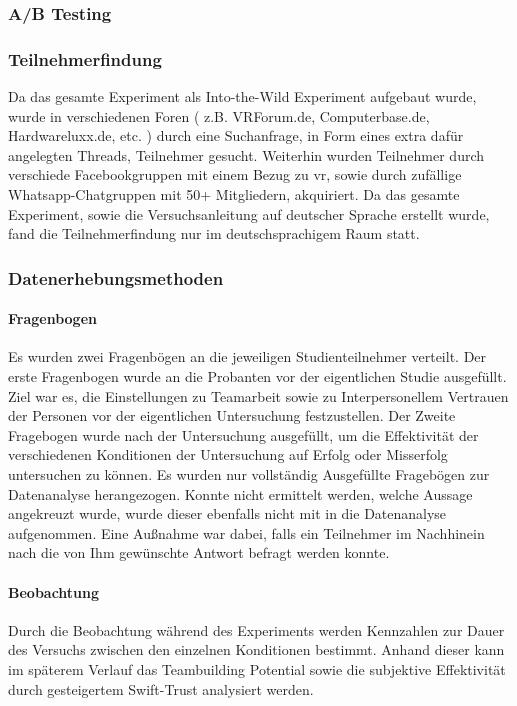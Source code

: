 \documentclass[a4paper,11pt]{article}%
\renewcommand{\\}{\vspace*{0.5\baselineskip} \newline}
\begin{document}
			\subsubsection{A/B Testing}
			\subsubsection{Teilnehmerfindung}
Da das gesamte Experiment als Into-the-Wild Experiment aufgebaut wurde, wurde in verschiedenen Foren ( z.B. VRForum.de, Computerbase.de, Hardwareluxx.de, etc. ) durch eine Suchanfrage, in Form eines extra dafür angelegten Threads, Teilnehmer gesucht. Weiterhin wurden Teilnehmer durch verschiede Facebookgruppen mit einem Bezug zu \ac{vr}, sowie durch zufällige Whatsapp-Chatgruppen mit 50+ Mitgliedern, akquiriert. Da das gesamte Experiment, sowie die Versuchsanleitung auf deutscher Sprache erstellt wurde, fand die Teilnehmerfindung nur im deutschsprachigem Raum statt.
			\subsubsection{Datenerhebungsmethoden}
				\paragraph{Fragenbogen}
Es wurden zwei Fragenbögen an die jeweiligen Studienteilnehmer verteilt. Der erste Fragenbogen wurde an die Probanten vor der eigentlichen Studie ausgefüllt. Ziel war es, die Einstellungen zu Teamarbeit sowie zu Interpersonellem Vertrauen der Personen vor der eigentlichen Untersuchung festzustellen. Der Zweite Fragebogen wurde nach der Untersuchung ausgefüllt, um die Effektivität der verschiedenen Konditionen der Untersuchung auf Erfolg oder Misserfolg untersuchen zu können.
				Es wurden nur vollständig Ausgefüllte Fragebögen zur Datenanalyse herangezogen. Konnte nicht ermittelt werden, welche Aussage angekreuzt wurde, wurde dieser ebenfalls nicht mit in die Datenanalyse aufgenommen. Eine Außnahme war dabei, falls ein Teilnehmer im Nachhinein nach die von Ihm gewünschte Antwort befragt werden konnte.
				\paragraph{Beobachtung}
				Durch die Beobachtung während des Experiments werden Kennzahlen zur Dauer des Versuchs zwischen den einzelnen Konditionen bestimmt. Anhand dieser kann im späterem Verlauf das  Teambuilding Potential sowie die subjektive Effektivität durch gesteigertem Swift-Trust analysiert werden.
\end{document}
